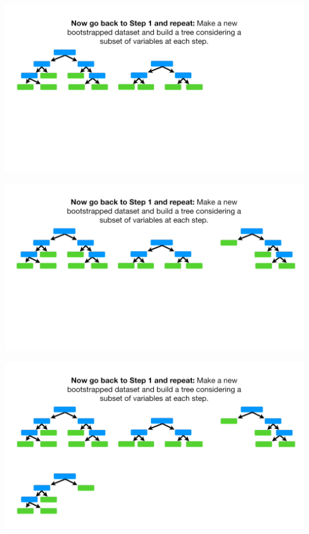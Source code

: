 \documentclass[
  ignorenonframetext,
]{beamer}
\begin{document}
\begin{frame}{}
\protect\hypertarget{section-38}{}
\includegraphics{images/r39.png}
\end{frame}

\begin{frame}{}
\protect\hypertarget{section-39}{}
\includegraphics{images/r40.png}
\end{frame}

\begin{frame}{}
\protect\hypertarget{section-40}{}
\includegraphics{images/r41.png}
\end{frame}
\end{document}
